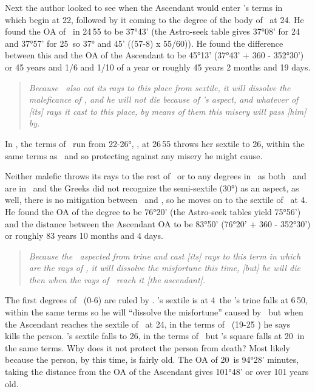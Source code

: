 Next  the author looked to see when the Ascendant would enter \Saturn's terms in \Taurus\, which begin at 22\Taurus, followed by it coming to the degree of the body of \Mars\, at 24\Taurus. He found the OA of \Mars\, in 24\Taurus\,55 to be 37°43' (the Astro-seek table gives 37°08' for 24\Taurus\, and 37°57' for 25\Taurus\, so 37° and 45' ((57-8) x 55/60)). He found the difference between this and the OA of the Ascendant to be 45°13' (37°43' + 360 - 352°30') or  45 years and 1/6 and 1/10 of a year or roughly 45 years 2 months and 19 days. 

\begin{quote}
\textsl{Because  \Venus\, also cat its rays to this place from sextile, it will dissolve the maleficance of \Mars, and he will not die because of \Venus's aspect, and whatever of [its] rays it cast to this place, by means of them this misery will pass [him] by.
}
\end{quote}

In \Taurus, the terms of \Saturn\, run from 22-26°, \Venus, at 26\Pisces\,55 throws her sextile to 26\Taurus, within the same terms as \Mars\, and so protecting against any misery he might cause.

Neither   malefic throws its rays to the rest of \Taurus\, or to any degrees in \Gemini\, as both \Saturn\, and \Mars\, are in \Taurus\, and the Greeks did not recognize the semi-sextile (30°) as an aspect, as well, there is no mitigation between \Taurus\, and \Gemini, so he moves on to the sextile of \Saturn\, at 4. He found the OA of the degree to be 76°20' (the Astro-seek tables yield 75°56') and the distance between the Ascendant OA to be 83°50' (76°20' + 360 - 352°30') or roughly 83 years 10 months and 4 days.
\begin{quote}
\textsl{Because the \Sun\, aspected from trine and cast [its] rays to this term in which are the rays of \Saturn, it will dissolve the misfortune this time, [but] he will die then when the rays of \Mars\, reach it [the ascendant].}
\end{quote}

The first degrees of \Cancer\, (0-6) are ruled by \Mars. \Saturn's sextile is at 4\Cancer\, the \Sun's trine falls at 6\Cancer\,50, within the same terms so he will ``dissolve the misfortune'' caused by \Saturn\, but when the Ascendant reaches the sextile of \Mars\, at 24\Cancer, in the terms of \Jupiter\, (19-25 \Cancer) he says  \Mars\, kills the person. \Venus's sextile falls to 26\Cancer, in the terms of \Saturn\, but \Jupiter's square falls at 20\Cancer\, in the same terms. Why does it not protect the person from death?  Most likely because the person, by this time, is fairly old. The OA of 20\Cancer\, is 94°28' minutes, taking the distance from the OA of the Ascendant gives 101°48' or over 101 years old.

